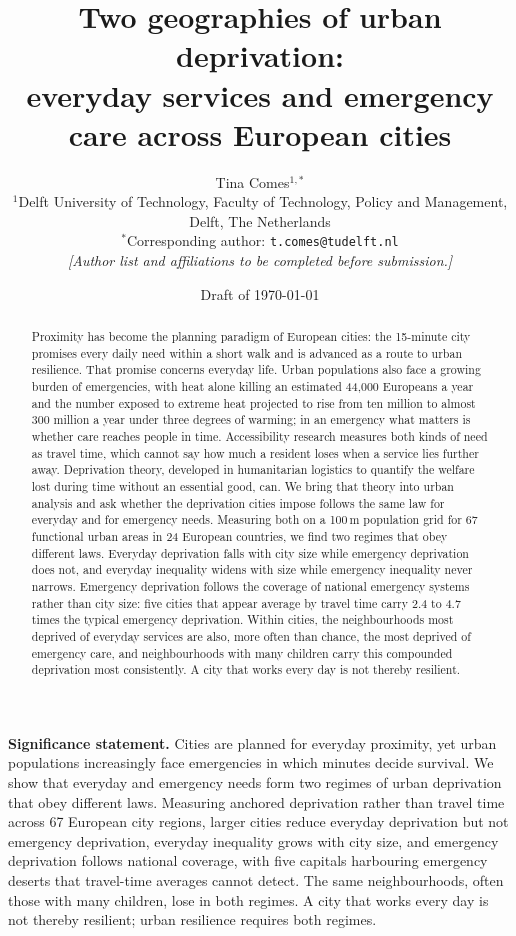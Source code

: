 \documentclass[11pt]{article}
\title{\textbf{Two geographies of urban deprivation:\\
everyday services and emergency care across European cities}}
\author{Tina Comes$^{1,\ast}$%
  \\[4pt]
  \small $^{1}$Delft University of Technology, Faculty of Technology, Policy and Management,\\
  \small Delft, The Netherlands\\
  \small $^{\ast}$Corresponding author: \texttt{t.comes@tudelft.nl}\\[2pt]
  \small \emph{[Author list and affiliations to be completed before submission.]}}
\date{Draft of \today}
\begin{document}
\maketitle

\begin{abstract}
\noindent
Proximity has become the planning paradigm of European cities: the
15-minute city promises every daily need within a short walk and is
advanced as a route to urban resilience. That promise concerns everyday
life. Urban populations also face a growing burden of emergencies, with
heat alone killing an estimated 44,000 Europeans a year and the number
exposed to extreme heat projected to rise from ten million to almost 300
million a year under three degrees of warming; in an emergency what
matters is whether care reaches people in time. Accessibility research
measures both kinds of need as travel time, which cannot say how much a
resident loses when a service lies further away. Deprivation theory,
developed in humanitarian logistics to quantify the welfare lost during
time without an essential good, can. We bring that theory into urban
analysis and ask whether the deprivation cities impose follows the same law
for everyday and for emergency needs. Measuring both on a 100\,m population
grid for 67 functional urban areas in 24 European countries, we find two
regimes that obey different laws. Everyday deprivation falls with city
size while emergency deprivation does not, and everyday inequality widens
with size while emergency inequality never narrows. Emergency deprivation
follows the coverage of national emergency systems rather than city size:
five cities that appear average by travel time carry 2.4 to 4.7 times the
typical emergency deprivation. Within cities, the neighbourhoods most
deprived of everyday services are also, more often than chance, the most
deprived of emergency care, and neighbourhoods with many children carry
this compounded deprivation most consistently. A city that works every day
is not thereby resilient.
\end{abstract}

\bigskip
\noindent\textbf{Significance statement.}
Cities are planned for everyday proximity, yet urban populations
increasingly face emergencies in which minutes decide survival. We show
that everyday and emergency needs form two regimes of urban deprivation
that obey different laws. Measuring anchored deprivation rather than
travel time across 67 European city regions, larger cities reduce everyday
deprivation but not emergency deprivation, everyday inequality grows with
city size, and emergency deprivation follows national coverage, with five
capitals harbouring emergency deserts that travel-time averages cannot
detect. The same neighbourhoods, often those with many children, lose in
both regimes. A city that works every day is not thereby resilient;
urban resilience requires both regimes.
\end{document}
